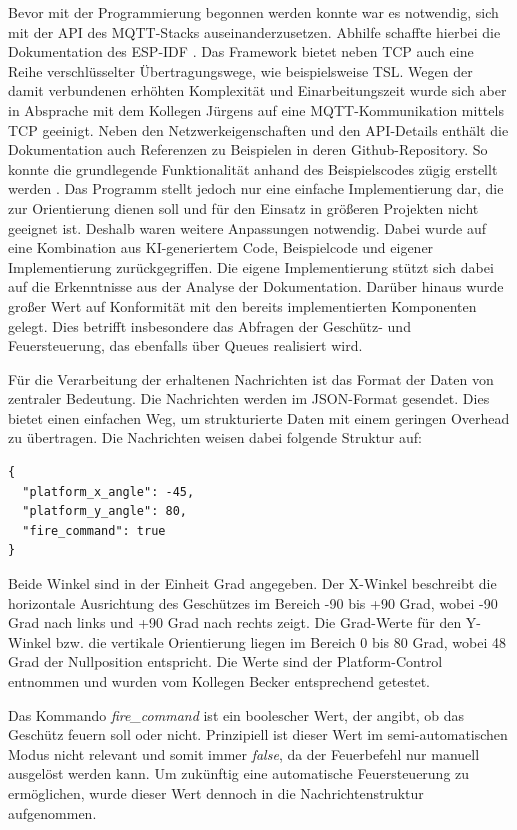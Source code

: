 Bevor mit der Programmierung begonnen werden konnte war es notwendig, sich mit der API des MQTT-Stacks auseinanderzusetzen. Abhilfe schaffte hierbei die Dokumentation des ESP-IDF \cite{esp32_mqtt}. Das Framework bietet neben TCP auch eine Reihe verschlüsselter Übertragungswege, wie beispielsweise TSL. Wegen der damit verbundenen erhöhten Komplexität und Einarbeitungszeit wurde sich aber in Absprache mit dem Kollegen Jürgens auf eine MQTT-Kommunikation mittels TCP geeinigt. Neben den Netzwerkeigenschaften und den API-Details enthält die Dokumentation auch Referenzen zu Beispielen in deren Github-Repository. So konnte die grundlegende Funktionalität anhand des Beispielscodes zügig erstellt werden \cite{esp32_mqtt_example}. Das Programm stellt jedoch nur eine einfache Implementierung dar, die zur Orientierung dienen soll und für den Einsatz in größeren Projekten nicht geeignet ist. Deshalb waren weitere Anpassungen notwendig. Dabei wurde auf eine Kombination aus KI-generiertem Code, Beispielcode und eigener Implementierung zurückgegriffen. Die eigene Implementierung stützt sich dabei auf die Erkenntnisse aus der Analyse der Dokumentation. Darüber hinaus wurde großer Wert auf Konformität mit den bereits implementierten Komponenten gelegt. Dies betrifft insbesondere das Abfragen der Geschütz- und Feuersteuerung, das ebenfalls über Queues realisiert wird. \newline

Für die Verarbeitung der erhaltenen Nachrichten ist das Format der Daten von zentraler Bedeutung. Die Nachrichten werden im JSON-Format gesendet. Dies bietet einen einfachen Weg, um strukturierte Daten mit einem geringen Overhead zu übertragen. Die Nachrichten weisen dabei folgende Struktur auf:

\begin{lstlisting}
{
  "platform_x_angle": -45,
  "platform_y_angle": 80,
  "fire_command": true
}
\end{lstlisting}

Beide Winkel sind in der Einheit Grad angegeben. Der X-Winkel beschreibt die horizontale Ausrichtung des Geschützes im Bereich -90 bis +90 Grad, wobei -90 Grad nach links und +90 Grad nach rechts zeigt. Die Grad-Werte für den Y-Winkel bzw. die vertikale Orientierung liegen im Bereich 0 bis 80 Grad, wobei 48 Grad der Nullposition entspricht. Die Werte sind der Platform-Control entnommen und wurden vom Kollegen Becker entsprechend getestet. \newline

Das Kommando \textit{fire\_command} ist ein boolescher Wert, der angibt, ob das Geschütz feuern soll oder nicht. Prinzipiell ist dieser Wert im semi-automatischen Modus nicht relevant und somit immer \textit{false}, da der Feuerbefehl nur manuell ausgelöst werden kann. Um zukünftig eine automatische Feuersteuerung zu ermöglichen, wurde dieser Wert dennoch in die Nachrichtenstruktur aufgenommen. \newline

